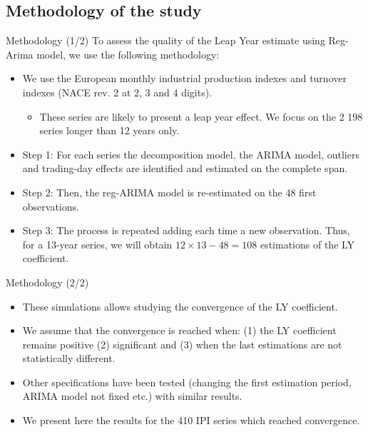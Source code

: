 \documentclass[10pt]{beamer}
\begin{document}
\subsection{Methodology of the study}
\begin{frame}{Methodology (1/2)}
To assess the quality of the Leap Year estimate using Reg-Arima model, we use the following methodology:
\begin{itemize}
	\item We use the European monthly industrial production indexes and turnover indexes (NACE rev. 2 at 2, 3 and 4 digits).
		\begin{itemize}
		  \item These series are likely to present a leap year effect. We focus on the 2 198 series longer than 12 years only.
	  \end{itemize}
	\item Step 1: For each series the decomposition model, the ARIMA model, outliers and trading-day effects are identified and estimated on the complete span.
	\item<2-> Step 2: Then, the reg-ARIMA model is re-estimated on the 48 first observations.
	\item<2-> Step 3: The process is repeated adding each time a new observation. Thus, for a 13-year series, we will obtain $12 \times 13 - 48 = 108$ estimations of the LY coefficient.
\end{itemize}
\end{frame}

\begin{frame}{Methodology (2/2)}
\begin{itemize}
	\item These simulations allows studying the convergence of the LY coefficient.
	\item We assume that the convergence is reached when: (1) the LY coefficient remains positive (2) significant and (3) when the last estimations are not statistically different.
	\item Other specifications have been tested (changing the first estimation period, ARIMA model not fixed etc.) with similar results.
	\item We present here the results for the 410 IPI series which reached convergence.
\end{itemize}
\end{frame}
\end{document}
